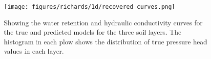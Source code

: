 \begin{figure}[ht]
\begin{center}
\texttt{[image: figures/richards/1d/recovered\_curves.png]}
\end{center}
\caption{
Showing the water retention and hydraulic conductivity curves for the true and predicted models for the three soil layers. The histogram in each plow shows the distribution of true pressure head values in each layer.
}
\label{fig:richards-1d-recovered_curves}
\end{figure}
